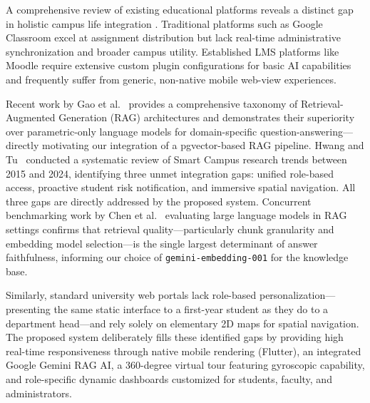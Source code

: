\documentclass[]{einformatica}
\begin{document}
A comprehensive review of existing educational platforms reveals a distinct gap in holistic campus life integration \cite{amershi2023, yao2023}. Traditional platforms such as Google Classroom excel at assignment distribution but lack real-time administrative synchronization and broader campus utility. Established LMS platforms like Moodle require extensive custom plugin configurations for basic AI capabilities and frequently suffer from generic, non-native mobile web-view experiences.

Recent work by Gao et al.~\cite{gao2024rag} provides a comprehensive taxonomy of Retrieval-Augmented Generation (RAG) architectures and demonstrates their superiority over parametric-only language models for domain-specific question-answering—directly motivating our integration of a pgvector-based RAG pipeline. Hwang and Tu~\cite{hwang2024smartcampus} conducted a systematic review of Smart Campus research trends between 2015 and 2024, identifying three unmet integration gaps: unified role-based access, proactive student risk notification, and immersive spatial navigation. All three gaps are directly addressed by the proposed system. Concurrent benchmarking work by Chen et al.~\cite{chen2024llmeval} evaluating large language models in RAG settings confirms that retrieval quality—particularly chunk granularity and embedding model selection—is the single largest determinant of answer faithfulness, informing our choice of \texttt{gemini-embedding-001} for the knowledge base.

Similarly, standard university web portals lack role-based personalization—presenting the same static interface to a first-year student as they do to a department head—and rely solely on elementary 2D maps for spatial navigation. The proposed system deliberately fills these identified gaps by providing high real-time responsiveness through native mobile rendering (Flutter), an integrated Google Gemini RAG AI, a 360-degree virtual tour featuring gyroscopic capability, and role-specific dynamic dashboards customized for students, faculty, and administrators.
\end{document}
